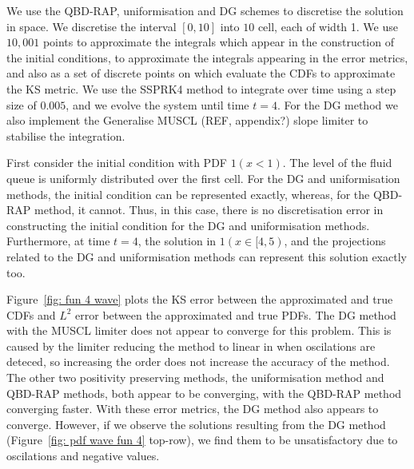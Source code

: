 We use the QBD-RAP, uniformisation and DG schemes to discretise the solution in space. We discretise the interval \([0,10]\) into \(10\) cell, each of width 1. We use \(10,001\) points to approximate the integrals which appear in the construction of the initial conditions, to approximate the integrals appearing in the error metrics, and also as a set of discrete points on which evaluate the CDFs to approximate the KS metric. We use the SSPRK4 method to integrate over time using a step size of \(0.005\), and we evolve the system until time \(t=4\). For the DG method we also implement the Generalise MUSCL (REF, appendix?) slope limiter to stabilise the integration. 

\begin{example}First consider the initial condition with PDF \(1(x<1)\). The level of the fluid queue is uniformly distributed over the first cell. For the DG and uniformisation methods, the initial condition can be represented exactly, whereas, for the QBD-RAP method, it cannot. Thus, in this case, there is no discretisation error in constructing the initial condition for the DG and uniformisation methods. Furthermore, at time \(t=4\), the solution in \(1(x\in[4,5)\), and the projections related to the DG and uniformisation methods can represent this solution exactly too.

Figure~\ref{fig: fun 4 wave} plots the KS error between the approximated and true CDFs and \(L^2\) error between the approximated and true PDFs. The DG method with the MUSCL limiter does not appear to converge for this problem. This is caused by the limiter reducing the method to linear in when oscilations are deteced, so increasing the order does not increase the accuracy of the method. The other two positivity preserving methods, the uniformisation method and QBD-RAP methods, both appear to be converging, with the QBD-RAP method converging faster. With these error metrics, the DG method also appears to converge. However, if we observe the solutions resulting from the DG method (Figure~\ref{fig: pdf wave fun 4} top-row), we find them to be unsatisfactory due to oscilations and negative values. 


\end{example}
